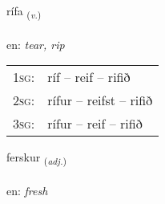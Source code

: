 \documentclass[frontgrid, backgrid]{flacards}\usepackage[]{graphicx}\usepackage[]{color}
\begin{document}
\renewcommand{\blhead}{\vskip5pt {\small\bfseries\footnotesize Sagnorð | Verb }}
\renewcommand{\bcfoot}{\vskip5pt \hspace{2pt}{\small\bfseries\footnotesize 2K}}


{rífa \small{\textsubscript{(\textit{v.})}} \\[1ex] %
\textphonetic{[riːva]} \\
en: \emph{tear, rip} \\  [2ex]
\renewcommand*{\arraystretch}{0.8}
\begin{tabular}{p{1cm}l}
\textsc{1sg}: & ríf -- reif -- rifið \\ 
\textsc{2sg}: & rífur -- reifst -- rifið \\ 
\textsc{3sg}: & rífur -- reif -- rifið \\ 
\end{tabular}
}

\renewcommand{\flhead}{\vskip5pt \fboxsep=0pt {\small\bfseries\footnotesize Lýsingarorð | Adjective}}
\renewcommand{\fcfoot}{\vskip5pt \fboxsep=0pt \hspace{2pt}{\small\bfseries\footnotesize 2K}}

\renewcommand{\blhead}{\vskip5pt {\small\bfseries\footnotesize Lýsingarorð | Adjective }}
\renewcommand{\bcfoot}{\vskip5pt \hspace{2pt}{\small\bfseries\footnotesize 2K}}


{ferskur \small{\textsubscript{(\textit{adj.})}} \\[1ex] %
 \\
en: \emph{fresh} \\  [2ex]
\renewcommand*{\arraystretch}{0.8}
}
\end{document}
